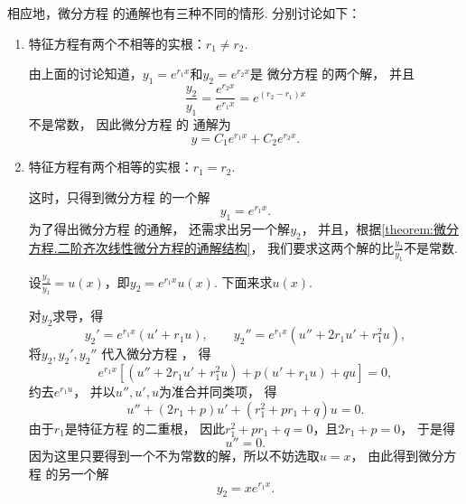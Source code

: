 相应地，微分方程  的通解也有三种不同的情形.
分别讨论如下：\begin{enumerate}
	\item 特征方程有两个不相等的实根：\(r_1 \neq r_2\).

	由上面的讨论知道，\(y_1 = e^{r_1 x}\)和\(y_2 = e^{r_2 x}\)是
	微分方程  的两个解，
	并且\begin{equation*}
		\frac{y_2}{y_1} = \frac{e^{r_2 x}}{e^{r_1 x}} = e^{(r_2-r_1) x}
	\end{equation*}不是常数，
	因此微分方程  的
	通解为\begin{equation}
		y = C_1 e^{r_1 x} + C_2 e^{r_2 x}.
	\end{equation}

	\item 特征方程有两个相等的实根：\(r_1 = r_2\).

	这时，只得到微分方程  的一个解\begin{equation*}
		y_1 = e^{r_1 x}.
	\end{equation*}
	为了得出微分方程  的通解，
	还需求出另一个解\(y_2\)，
	并且，根据\cref{theorem:微分方程.二阶齐次线性微分方程的通解结构}，
	我们要求这两个解的比\(\frac{y_2}{y_1}\)不是常数.

	设\(\frac{y_2}{y_1} = u(x)\)，即\(y_2 = e^{r_1 x} u(x)\).
	下面来求\(u(x)\).

	对\(y_2\)求导，得\begin{equation*}
		y_2' = e^{r_1 x} (u' + r_1 u),
		\qquad
		y_2'' = e^{r_1 x} (u'' + 2 r_1 u' + r_1^2 u),
	\end{equation*}
	将\(y_2,y_2',y_2''\)
	代入微分方程 ，
	得\begin{equation*}
		e^{r_1 x} [(u'' + 2 r_1 u' + r_1^2 u) + p(u' + r_1 u) + qu] = 0,
	\end{equation*}
	约去\(e^{r_1 u}\)，
	并以\(u'',u',u\)为准合并同类项，
	得\begin{equation*}
		u'' + (2 r_1 + p) u' + (r_1^2 + p r_1 + q) u = 0.
	\end{equation*}
	由于\(r_1\)是特征方程  的二重根，
	因此\(r_1^2 + p r_1 + q = 0\)，且\(2 r_1 + p = 0\)，
	于是得\begin{equation*}
		u'' = 0.
	\end{equation*}
	因为这里只要得到一个不为常数的解，所以不妨选取\(u = x\)，
	由此得到微分方程  的另一个解\begin{equation*}
		y_2 = x e^{r_1 x}.
	\end{equation*}


\end{enumerate}
